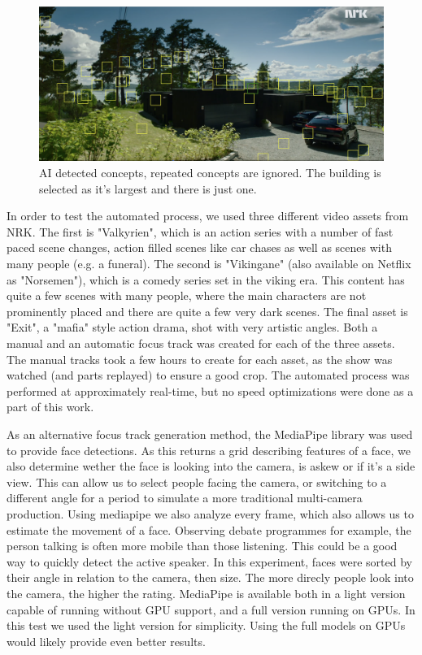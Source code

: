 \documentclass[sigconf, review=true]{acmart}
\begin{document}
\begin{figure}
\begin{center}
\includegraphics[width=1.0\columnwidth]{track_stuff.png}
\caption{AI detected concepts, repeated concepts are ignored. The building is
 selected as it's largest and there is just one.}
\label{fig_stuff_tracking}
\end{center}
\end{figure}

In order to test the automated process, we used three different video assets
from NRK. The first is "Valkyrien", which is an action series with a number
of fast paced scene changes, action filled scenes like car chases as well as
scenes with many people (e.g. a funeral). The second is "Vikingane"
(also available on Netflix as "Norsemen"), which is a comedy series set in
the viking era. This content has quite a few scenes with many people, where
the main characters are not prominently placed and there are quite a few very
dark scenes. The final asset is "Exit", a "mafia" style action drama, shot
with very artistic angles. Both a manual and an automatic focus track was
created for each of the three assets. The manual tracks took a few hours to
create for each asset, as the show was watched (and parts replayed) to ensure
a good crop. The automated process was performed at approximately real-time,
but no speed optimizations were done as a part of this work.

As an alternative focus track generation method, the MediaPipe library\cite
{mediapipe} was used to provide face detections. As this returns a grid
describing features of a face, we also determine wether the face is looking
into the camera, is askew or if it's a side view. This can allow us to select
people facing the camera, or switching to a different angle for a period to
simulate a more traditional multi-camera production. Using mediapipe we also
analyze every frame, which also allows us to estimate the movement of a face.
Observing debate programmes for example, the person talking is often more
mobile than those listening. This could be a good way to quickly detect the
active speaker. In this experiment, faces were sorted by their angle in
relation to the camera, then size. The more direcly people look into the
camera, the higher the rating. MediaPipe is available both in a light version
capable of running without GPU support, and a full version running on GPUs.
In this test we used the light version for simplicity. Using the full models
on GPUs would likely provide even better results.
\end{document}

